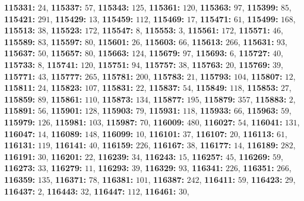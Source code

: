 \textsf{\bfseries 115331:} $24$, \textsf{\bfseries 115337:} $57$, \textsf{\bfseries 115343:} $125$, \textsf{\bfseries 115361:} $120$, \textsf{\bfseries 115363:} $97$, \textsf{\bfseries 115399:} $85$, \textsf{\bfseries 115421:} $291$, \textsf{\bfseries 115429:} $13$, \textsf{\bfseries 115459:} $112$, \textsf{\bfseries 115469:} $17$, \textsf{\bfseries 115471:} $61$, \textsf{\bfseries 115499:} $168$, \textsf{\bfseries 115513:} $38$, \textsf{\bfseries 115523:} $172$, \textsf{\bfseries 115547:} $8$, \textsf{\bfseries 115553:} $3$, \textsf{\bfseries 115561:} $172$, \textsf{\bfseries 115571:} $46$, \textsf{\bfseries 115589:} $83$, \textsf{\bfseries 115597:} $80$, \textsf{\bfseries 115601:} $26$, \textsf{\bfseries 115603:} $66$, \textsf{\bfseries 115613:} $266$, \textsf{\bfseries 115631:} $93$, \textsf{\bfseries 115637:} $50$, \textsf{\bfseries 115657:} $80$, \textsf{\bfseries 115663:} $124$, \textsf{\bfseries 115679:} $97$, \textsf{\bfseries 115693:} $6$, \textsf{\bfseries 115727:} $40$, \textsf{\bfseries 115733:} $8$, \textsf{\bfseries 115741:} $120$, \textsf{\bfseries 115751:} $94$, \textsf{\bfseries 115757:} $38$, \textsf{\bfseries 115763:} $20$, \textsf{\bfseries 115769:} $39$, \textsf{\bfseries 115771:} $43$, \textsf{\bfseries 115777:} $265$, \textsf{\bfseries 115781:} $200$, \textsf{\bfseries 115783:} $21$, \textsf{\bfseries 115793:} $104$, \textsf{\bfseries 115807:} $12$, \textsf{\bfseries 115811:} $24$, \textsf{\bfseries 115823:} $107$, \textsf{\bfseries 115831:} $22$, \textsf{\bfseries 115837:} $54$, \textsf{\bfseries 115849:} $118$, \textsf{\bfseries 115853:} $27$, \textsf{\bfseries 115859:} $89$, \textsf{\bfseries 115861:} $110$, \textsf{\bfseries 115873:} $134$, \textsf{\bfseries 115877:} $195$, \textsf{\bfseries 115879:} $357$, \textsf{\bfseries 115883:} $2$, \textsf{\bfseries 115891:} $56$, \textsf{\bfseries 115901:} $128$, \textsf{\bfseries 115903:} $79$, \textsf{\bfseries 115931:} $118$, \textsf{\bfseries 115933:} $66$, \textsf{\bfseries 115963:} $59$, \textsf{\bfseries 115979:} $126$, \textsf{\bfseries 115981:} $103$, \textsf{\bfseries 115987:} $70$, \textsf{\bfseries 116009:} $480$, \textsf{\bfseries 116027:} $54$, \textsf{\bfseries 116041:} $131$, \textsf{\bfseries 116047:} $14$, \textsf{\bfseries 116089:} $148$, \textsf{\bfseries 116099:} $10$, \textsf{\bfseries 116101:} $37$, \textsf{\bfseries 116107:} $20$, \textsf{\bfseries 116113:} $61$, \textsf{\bfseries 116131:} $119$, \textsf{\bfseries 116141:} $40$, \textsf{\bfseries 116159:} $226$, \textsf{\bfseries 116167:} $38$, \textsf{\bfseries 116177:} $14$, \textsf{\bfseries 116189:} $282$, \textsf{\bfseries 116191:} $30$, \textsf{\bfseries 116201:} $22$, \textsf{\bfseries 116239:} $34$, \textsf{\bfseries 116243:} $15$, \textsf{\bfseries 116257:} $45$, \textsf{\bfseries 116269:} $59$, \textsf{\bfseries 116273:} $33$, \textsf{\bfseries 116279:} $11$, \textsf{\bfseries 116293:} $39$, \textsf{\bfseries 116329:} $93$, \textsf{\bfseries 116341:} $226$, \textsf{\bfseries 116351:} $266$, \textsf{\bfseries 116359:} $135$, \textsf{\bfseries 116371:} $78$, \textsf{\bfseries 116381:} $101$, \textsf{\bfseries 116387:} $242$, \textsf{\bfseries 116411:} $59$, \textsf{\bfseries 116423:} $29$, \textsf{\bfseries 116437:} $2$, \textsf{\bfseries 116443:} $32$, \textsf{\bfseries 116447:} $112$, \textsf{\bfseries 116461:} $30$, 
